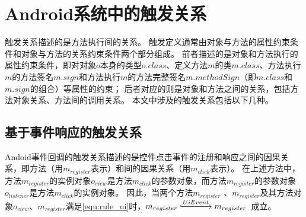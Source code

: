 	
\section{Android系统中的触发关系}

触发关系描述的是方法执行间的关系。
触发定义通常由对象与方法的属性约束条件和对象与方法的关系约束条件两个部分组成。
前者描述的是对象和方法执行的属性约束条件，即对对象$o$本身的类型$o.class$、定义方法$m$的类$m.class$、方法执行$m$的方法签名$m.sign$和方法执行$m$的方法完整签名$m.methodSign$（即$m.class$和$m.sign$的组合）等属性的约束；
后者对应的则是对象和方法之间的关系，包括方法对象关系、方法间的调用关系。
本文中涉及的触发关系包括以下几种。



\subsection{基于事件响应的触发关系}


Andoid事件回调的触发关系描述的是控件点击事件的注册和响应之间的因果关系，即方法（用$m_{register}$表示）和间的因果关系（用$m_{click}$表示）。
在上述方法中，方法$m_{register}$的实例对象$o_{view}$是方法$m_{click}$的参数对象，而方法$m_{register}$的参数对象$o_{listener}$是方法$m_{click}$的实例对象。
因此，当两个方法$m_{register}$ 、$m_{register}$及其方法对象$o_{view}$、$m_{register}$满足\autoref{equ:rule_ui}时，$m_{register} \lhook\joinrel\xrightarrow{UiEvent}  m_{register}  $ 成立。


